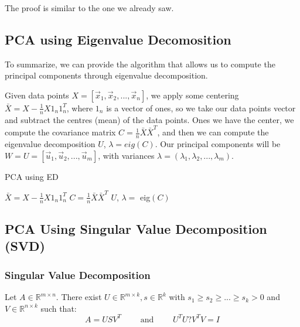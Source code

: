 The proof is similar to the one we already saw.

\subsection{PCA using Eigenvalue Decomosition}
To summarize, we can provide the algorithm that allows us to compute the principal components through eigenvalue decomposition.

Given data points \(X = \left[\vec{x}_1, \vec{x}_2, ..., \vec{x}_n \right]\), we apply some centering \(\bar{X} = X - \frac 1 n X 1_n 1_n^T\), where \(1_n\) is a vector of ones, so we take our data points vector and subtract the centres (mean) of the data points. Ones we have the center, we compute the covariance matrix \(C = \frac 1 n \bar{X} \bar{X}^T\), and then we can compute the eigenvalue decomposition \(U\), \(\lambda = eig(C)\). Our principal components will be \(W = U = \left[ \vec{u}_1, \vec{u}_2, ..., \vec{u}_m \right]\), with variances \(\lambda = \left( \lambda_1, \lambda_2, ..., \lambda_m \right)\).
\begin{algorithm}
    \caption{PCA using ED}
    $\bar X = X - \frac 1 n X 1_n 1_n^T$\;
    $C = \frac 1 n \bar X \bar X^T$\;
    $U$, $\lambda = $ eig$(C)$\;
\end{algorithm}

\subsection{PCA Using Singular Value Decomposition (SVD)}
\subsubsection{Singular Value Decomposition}
Let \(A \in \mathbb{R}^{m \times n}\). There exist \(U \in \mathbb{R}^{m \times k}, s \in \mathbb{R}^k\) with \(s_1 \geq s_2 \geq ... \geq s_k > 0\) and \(V \in \mathbb{R}^{n \times k}\) such that:
\begin{equation}
    A = USV^T \qquad \text{ and } \qquad U^TU ? V^TV = I
\end{equation}


